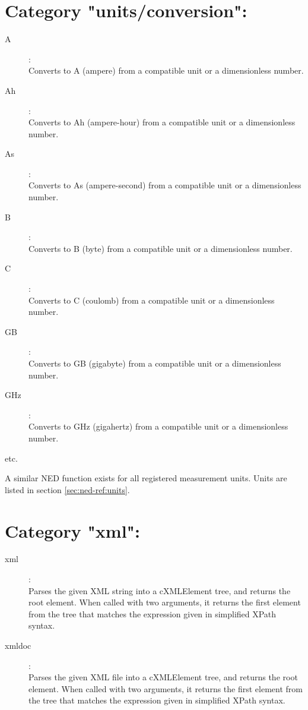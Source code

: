 \section{Category "units/conversion":}
\label{sec:ned-functions:category-units-conversion}

\begin{description}
\item[A]:  \\
    Converts to A (ampere) from a compatible unit or a dimensionless number.
\item[Ah]:  \\
    Converts to Ah (ampere-hour) from a compatible unit or a dimensionless number.
\item[As]:  \\
    Converts to As (ampere-second) from a compatible unit or a dimensionless number.
\item[B]:  \\
    Converts to B (byte) from a compatible unit or a dimensionless number.
\item[C]:  \\
    Converts to C (coulomb) from a compatible unit or a dimensionless number.
\item[GB]:  \\
    Converts to GB (gigabyte) from a compatible unit or a dimensionless number.
\item[GHz]:  \\
    Converts to GHz (gigahertz) from a compatible unit or a dimensionless number.
\item[etc.]
\end{description}

A similar NED function exists for all registered measurement units.
Units are listed in section \ref{sec:ned-ref:units}.


\section{Category "xml":}
\label{sec:ned-functions:category-xml}

\begin{description}
\item[xml]:  \\
    Parses the given XML string into a cXMLElement tree, and returns the root element. When called with two arguments, it returns the first element from the tree that matches the expression given in simplified XPath syntax.
\item[xmldoc]:  \\
    Parses the given XML file into a cXMLElement tree, and returns the root element. When called with two arguments, it returns the first element from the tree that matches the expression given in simplified XPath syntax.
\end{description}

